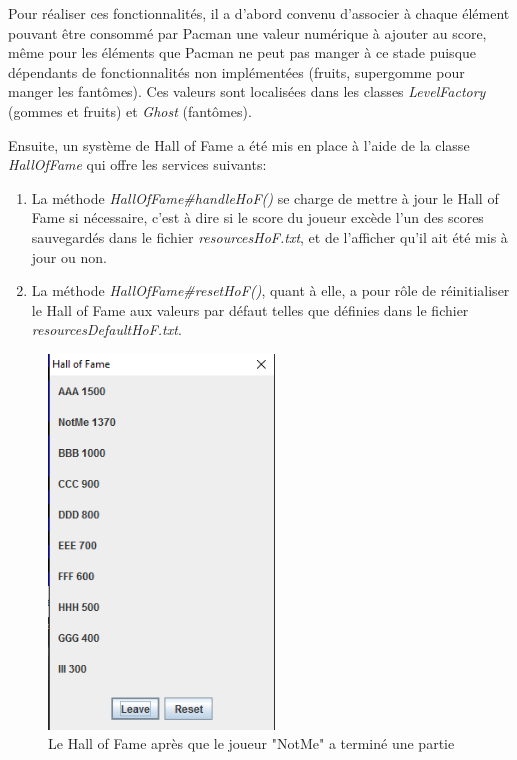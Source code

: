 \documentclass[12pt, openany]{report}
\begin{document}
Pour réaliser ces fonctionnalités, il a d'abord convenu d'associer à chaque élément pouvant être consommé par Pacman une valeur numérique à ajouter au score, même pour les éléments que Pacman ne peut pas manger à ce stade puisque dépendants de fonctionnalités non implémentées (fruits, supergomme pour manger les fantômes).
Ces valeurs sont localisées dans les classes \mbox{\textit{LevelFactory}} (gommes et fruits) et \mbox{\textit{Ghost}} (fantômes).

Ensuite, un système de Hall of Fame a été mis en place à l'aide de la classe \mbox{\textit{HallOfFame}} qui offre les services suivants:

\begin{enumerate}
\item La méthode \mbox{\textit{HallOfFame\#handleHoF()}} se charge de mettre à jour le Hall of Fame si nécessaire, c'est à dire si le score du joueur excède l'un des scores sauvegardés dans le fichier \mbox{\textit{resources\\HoF.txt}}, et de l'afficher qu'il ait été mis à jour ou non.
\item La méthode \mbox{\textit{HallOfFame\#resetHoF()}}, quant à elle, a pour rôle de réinitialiser le Hall of Fame aux valeurs par défaut telles que définies dans le fichier \mbox{\textit{resources\\DefaultHoF.txt}}.
\end{enumerate}

\begin{figure}[h]
	\centering
	\includegraphics[width=6cm]{Images/HoF.png}
	\caption{\label{hof} Le Hall of Fame après que le joueur "NotMe" a terminé une partie}
\end{figure}
\end{document}
